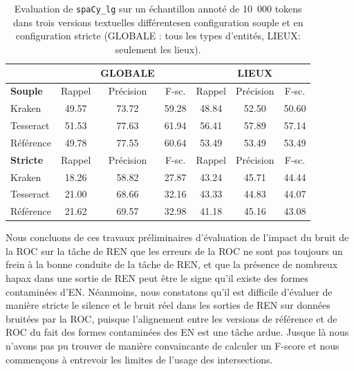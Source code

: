 \begin{table}[h!]
\centering
\scriptsize{\begin{tabular}{l|ccc|ccc}
 &		&	GLOBALE	&		&		&	LIEUX	&		\\
\hline
 \hline
\textbf{Souple}	&	Rappel		&Précision	&	F-sc.	&	Rappel&		Précision		&F-sc.	\\
 \hline
Kraken	&	49.57	&	73.72 	&	59.28	&	48.84	&	52.50	&	50.60	\\
													
Tesseract	&	51.53	&	77.63	&	61.94	&	56.41	&	57.89	&	57.14	\\
													
Référence	&	49.78	&	77.55	&	60.64	&	53.49	&	53.49	&	53.49	\\
\hline
\hline
\textbf{Stricte}	&	Rappel		&Précision	&	F-sc.	&	Rappel&		Précision		&F-sc.	 \\
\hline
Kraken	&	18.26	&	58.82	&	27.87	&	43.24	&	45.71	&	44.44	\\
Tesseract	&	21.00	&	68.66	&	32.16	&	43.33	&	44.83	&	44.07	\\
Référence	&	21.62	&	69.57	&	32.98	&	41.18	&	45.16	&	43.08	\\
\hline
\hline
\end{tabular}}
\caption{Evaluation de \texttt{spaCy\_lg} sur un échantillon annoté de 10~000 tokens dans trois versions textuelles différentes\label{tab:eval-supervise} en configuration souple et en configuration stricte (GLOBALE : tous les types d'entités, LIEUX: seulement les lieux).}
 \end{table}

Nous concluons de ces travaux préliminaires d'évaluation de l'impact du bruit de la ROC sur la tâche de REN que les erreurs de la ROC ne sont pas toujours un frein à la bonne conduite de la tâche de REN, et que la présence de nombreux hapax dans une sortie de REN peut être le signe qu'il existe des formes contaminées d'EN. Néanmoins, nous constatons qu'il est difficile d'évaluer de manière stricte le silence et le bruit réel dans les sorties de REN sur données bruitées par la ROC, puisque l'alignement entre les versions de référence et de ROC du fait des formes contaminées des EN est une tâche ardue. Jusque là nous n'avons pas pu trouver de manière convaincante de calculer un F-score et nous commençons à entrevoir les limites de l'usage des intersections.



